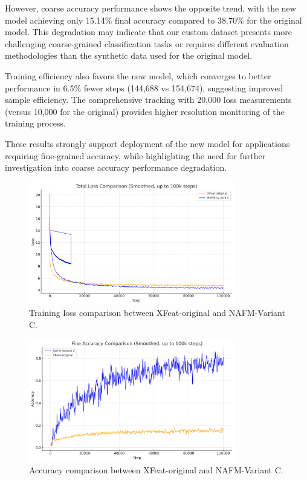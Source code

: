 However, coarse accuracy performance shows the opposite trend, with the new model achieving only 15.14\% final accuracy compared to 38.70\% for the original model. This degradation may indicate that our custom dataset presents more challenging coarse-grained classification tasks or requires different evaluation methodologies than the synthetic data used for the original model.

Training efficiency also favors the new model, which converges to better performance in 6.5\% fewer steps (144,688 vs 154,674), suggesting improved sample efficiency. The comprehensive tracking with 20,000 loss measurements (versus 10,000 for the original) provides higher resolution monitoring of the training process.

These results strongly support deployment of the new model for applications requiring fine-grained accuracy, while highlighting the need for further investigation into coarse accuracy performance degradation.

\begin{figure}[H]
    \centering
    \includegraphics[width=0.8\textwidth]{ressources/comparative_losses.png}
    \caption{Training loss comparison between XFeat-original and NAFM-Variant C.}
    \label{fig:loss_comparison}
\end{figure}

\begin{figure}[H]
    \centering
    \includegraphics[width=0.8\textwidth]{ressources/comaprative_accuracy.png}
    \caption{Accuracy comparison between XFeat-original and NAFM-Variant C.}
    \label{fig:accuracy_comparison}
\end{figure}

